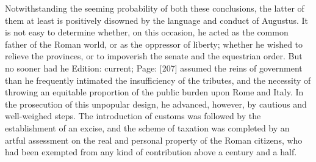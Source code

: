 Notwithstanding the seeming probability of both these conclusions, the latter of them at least is positively disowned by the language and conduct of Augustus. It is not easy to determine whether, on this occasion, he acted as the common father of the Roman world, or as the oppressor of liberty; whether he wished to relieve the provinces, or to impoverish the senate and the equestrian order. But no sooner had he Edition: current; Page: [207] assumed the reins of government than he frequently intimated the insufficiency of the tributes, and the necessity of throwing an equitable proportion of the public burden upon Rome and Italy. In the prosecution of this unpopular design, he advanced, however, by cautious and well-weighed steps. The introduction of customs was followed by the establishment of an excise, and the scheme of taxation was completed by an artful assessment on the real and personal property of the Roman citizens, who had been exempted from any kind of contribution above a century and a half.

